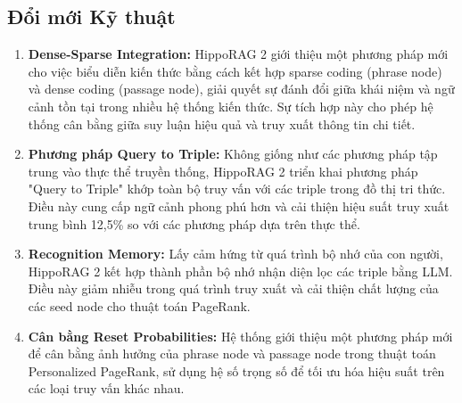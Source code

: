\documentclass[../main.tex]{subfiles}
\begin{document}
\subsection{Đổi mới Kỹ thuật}
\begin{enumerate}
\item \textbf{Dense-Sparse Integration:} HippoRAG 2 giới thiệu một phương pháp mới cho việc biểu diễn kiến thức bằng cách kết hợp sparse coding (phrase node) và dense coding (passage node), giải quyết sự đánh đổi giữa khái niệm và ngữ cảnh tồn tại trong nhiều hệ thống kiến thức. Sự tích hợp này cho phép hệ thống cân bằng giữa suy luận hiệu quả và truy xuất thông tin chi tiết.

\item \textbf{Phương pháp Query to Triple:} Không giống như các phương pháp tập trung vào thực thể truyền thống, HippoRAG 2 triển khai phương pháp "Query to Triple" khớp toàn bộ truy vấn với các triple trong đồ thị tri thức. Điều này cung cấp ngữ cảnh phong phú hơn và cải thiện hiệu suất truy xuất trung bình 12,5\% so với các phương pháp dựa trên thực thể.

\item \textbf{Recognition Memory:} Lấy cảm hứng từ quá trình bộ nhớ của con người, HippoRAG 2 kết hợp thành phần bộ nhớ nhận diện lọc các triple bằng LLM. Điều này giảm nhiễu trong quá trình truy xuất và cải thiện chất lượng của các seed node cho thuật toán PageRank.

\item \textbf{Cân bằng Reset Probabilities:} Hệ thống giới thiệu một phương pháp mới để cân bằng ảnh hưởng của phrase node và passage node trong thuật toán Personalized PageRank, sử dụng hệ số trọng số để tối ưu hóa hiệu suất trên các loại truy vấn khác nhau.
\end{enumerate}
\end{document}
